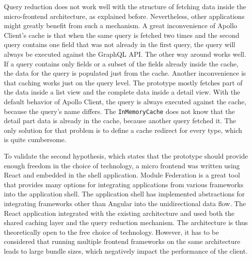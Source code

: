 \bigskip

\noindent Query reduction does not work well with the structure of fetching data inside the micro-frontend architecture, as explained before. Nevertheless, other applications might greatly benefit from such a mechanism. A great inconvenience of Apollo Client's cache is that when the same query is fetched two times and the second query contains one field that was not already in the first query, the query will always be executed against the GraphQL \ac{API}. The other way around works well. If a query contains only fields or a subset of the fields already inside the cache, the data for the query is populated just from the cache. Another inconvenience is that caching works just on the query level. The prototype mostly fetches part of the data inside a list view and the complete data inside a detail view. With the default behavior of Apollo Client, the query is always executed against the cache, because the query's name differs. The \texttt{InMemoryCache} does not know that the detail part data is already in the cache, because another query fetched it. The only solution for that problem is to define a cache redirect for every type, which is quite cumbersome.

\bigskip

\noindent To validate the second hypothesis, which states that the prototype should provide enough freedom in the choice of technology, a micro frontend was written using React and embedded in the shell application. Module Federation is a great tool that provides many options for integrating applications from various frameworks into the application shell. The application shell has implemented abstractions for integrating frameworks other than Angular into the unidirectional data flow. The React application integrated with the existing architecture and used both the shared caching layer and the query reduction mechanism. The architecture is thus theoretically open to the free choice of technology. However, it has to be considered that running multiple frontend frameworks on the same architecture leads to large bundle sizes, which negatively impact the performance of the client.